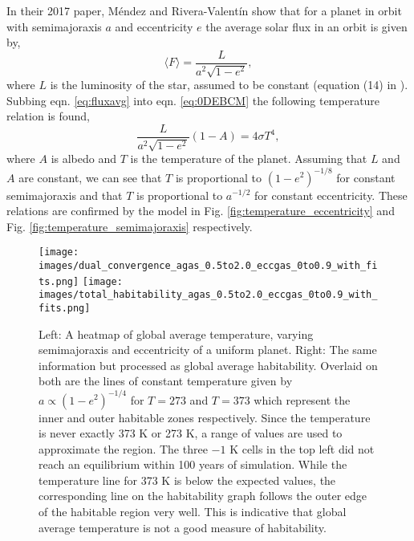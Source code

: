 \documentclass[12pt, onecolumn]{revtex4-2}    %
\begin{document}
In their 2017 paper, Méndez and Rivera-Valentín show that for a planet in orbit with semimajoraxis $a$ and eccentricity $e$ the average solar flux in an orbit is given by,
\begin{equation} \label{eq:fluxavg}
    \langle F\rangle = \frac{L}{a^2 \sqrt{1-e^2}},
\end{equation}
where $L$ is the luminosity of the star, assumed to be constant (equation (14) in \cite{Mendez2017}).
Subbing eqn. \eqref{eq:fluxavg} into eqn. \eqref{eq:0DEBCM} the following temperature relation is found,
\begin{equation}
    \frac{L}{a^2 \sqrt{1-e^2}} (1-A) = 4 \sigma T^4,
    \label{eq:Temp_eccent}
\end{equation}
where $A$ is albedo and $T$ is the temperature of the planet.
Assuming that $L$ and $A$ are constant, we can see that $T$ is proportional to $(1-e^2)^{-1/8}$ for constant semimajoraxis and that $T$ is proportional to $a^{-1/2}$ for constant eccentricity.
These relations are confirmed by the model in Fig. \ref{fig:temperature_eccentricity} and Fig. \ref{fig:temperature_semimajoraxis} respectively.

\begin{figure}
    \texttt{[image: images/dual\_convergence\_agas\_0.5to2.0\_eccgas\_0to0.9\_with\_fits.png]}
    \texttt{[image: images/total\_habitability\_agas\_0.5to2.0\_eccgas\_0to0.9\_with\_fits.png]}
    \caption{Left: A heatmap of global average temperature, varying semimajoraxis and eccentricity of a uniform planet.
        Right: The same information but processed as global average habitability.
        Overlaid on both are the lines of constant temperature given by $a \propto (1-e^2)^{-1/4}$ for $T = 273$ and $T = 373$ which represent the inner and outer habitable zones respectively.
        Since the temperature is never exactly 373 K or 273 K, a range of values are used to approximate the region.
        The three $-1$ K cells in the top left did not reach an equilibrium within 100 years of simulation.
        While the temperature line for 373 K is below the expected values, the corresponding line on the habitability graph follows the outer edge of the habitable region very well.
        This is indicative that global average temperature is not a good measure of habitability.
    }
    \label{fig:semiecc_temphab}
\end{figure}
\end{document}
